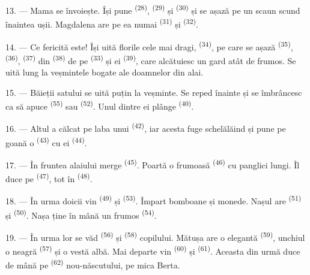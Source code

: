 13. --- Mama se învoiește. Își pune  \textsuperscript{(28)},
 \textsuperscript{(29)} și  \textsuperscript{(30)}
și se așază pe un scaun scund înaintea ușii. Magdalena are pe ea numai
 \textsuperscript{(31)} și 
\textsuperscript{(32)}.

14. --- Ce fericită este! Își uită florile cele mai dragi, 
\textsuperscript{(34)}, pe care se așază 
\textsuperscript{(35)},  \textsuperscript{(36)},
 \textsuperscript{(37)} din 
\textsuperscript{(38)} de pe  \textsuperscript{(33)} și
 ei \textsuperscript{(39)}, care alcătuiesc un gard atât de
frumos. Se uită lung la veșmintele bogate ale doamnelor din alai.

15. --- Băieții satului se uită puțin la veșminte. Se reped înainte și se
îmbrâncesc ca să apuce  \textsuperscript{(55)} sau
 \textsuperscript{(52)}. Unul dintre ei plânge
\textsuperscript{(40)}.

16. --- Altul a călcat pe laba unui  \textsuperscript{(42)}, iar
acesta fuge schelălăind și pune pe goană o 
\textsuperscript{(43)} cu  ei \textsuperscript{(44)}.

\VUsaut{5.0mm}
\VUsaut{4.0mm}

17. --- În fruntea alaiului merge  \textsuperscript{(45)}. Poartă o
 frumoasă \textsuperscript{(46)} cu panglici lungi. Îl duce pe
 \textsuperscript{(47)}, tot în 
\textsuperscript{(48)}.

18. --- În urma doicii vin  \textsuperscript{(49)} și
 \textsuperscript{(53)}. Împart bomboane și monede. Nașul are
 \textsuperscript{(51)} și  \textsuperscript{(50)}.
Nașa ține în mână un  frumos \textsuperscript{(54)}.

19. --- În urma lor se văd  \textsuperscript{(56)} și
 \textsuperscript{(58)} copilului. Mătușa are o 
elegantă \textsuperscript{(59)}, unchiul o  neagră
\textsuperscript{(57)} și o vestă albă. Mai departe vin 
\textsuperscript{(60)} și  \textsuperscript{(61)}. Aceasta din
urmă duce de mână pe  \textsuperscript{(62)} nou-născutului, pe mica
Berta.

